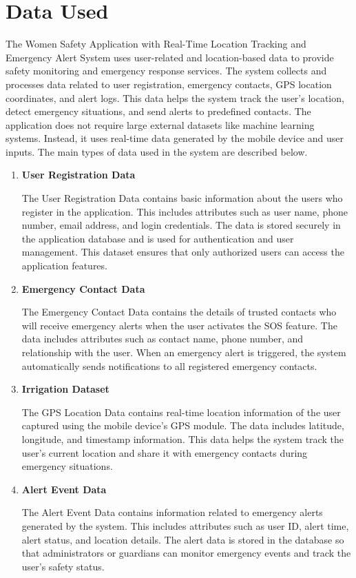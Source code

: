 \documentclass[a4paper,12pt]{report}
\begin{document}
\section{Data Used}

\par The Women Safety Application with Real-Time Location Tracking and Emergency Alert System uses user-related and location-based data to provide safety monitoring and emergency response services. The system collects and processes data related to user registration, emergency contacts, GPS location coordinates, and alert logs. This data helps the system track the user’s location, detect emergency situations, and send alerts to predefined contacts.
The application does not require large external datasets like machine learning systems. Instead, it uses real-time data generated by the mobile device and user inputs. The main types of data used in the system are described below.\\

\begin{enumerate}

\item \textbf{User Registration Data}

The User Registration Data contains basic information about the users who register in the application. This includes attributes such as user name, phone number, email address, and login credentials. The data is stored securely in the application database and is used for authentication and user management. This dataset ensures that only authorized users can access the application features.

\item \textbf{Emergency Contact Data}

The Emergency Contact Data contains the details of trusted contacts who will receive emergency alerts when the user activates the SOS feature. The data includes attributes such as contact name, phone number, and relationship with the user. When an emergency alert is triggered, the system automatically sends notifications to all registered emergency contacts.

\item \textbf{Irrigation Dataset}

The GPS Location Data contains real-time location information of the user captured using the mobile device’s GPS module. The data includes latitude, longitude, and timestamp information. This data helps the system track the user’s current location and share it with emergency contacts during emergency situations.

\item \textbf{Alert Event Data}

The Alert Event Data contains information related to emergency alerts generated by the system. This includes attributes such as user ID, alert time, alert status, and location details. The alert data is stored in the database so that administrators or guardians can monitor emergency events and track the user’s safety status.

\end{enumerate}
\end{document}
